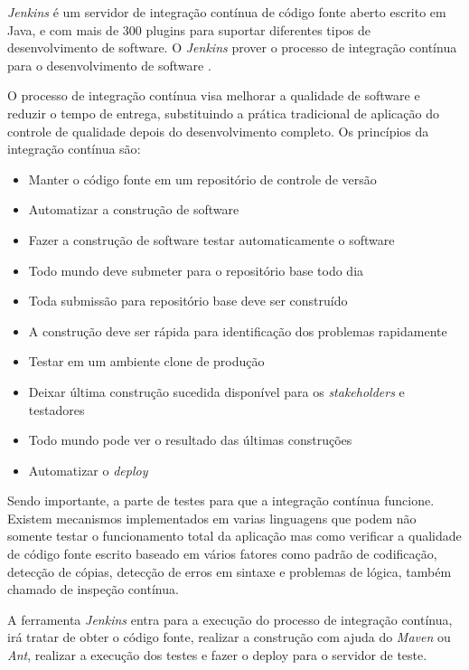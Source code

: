 \documentclass{abnt}
\begin{document}
				\emph{Jenkins} é um servidor de integração contínua de código fonte aberto escrito em Java, e com mais de 300 plugins para
				suportar diferentes tipos de desenvolvimento de software. O \emph{Jenkins} prover o processo de integração contínua para o
				desenvolvimento de software \cite{JENKINS}.
				
				O processo de integração contínua visa melhorar a qualidade de software e reduzir o tempo de entrega, substituindo a
				prática tradicional de aplicação do controle de qualidade depois do desenvolvimento completo. Os princípios da
				integração contínua são\cite{CIWIKIPEDIA}:
				\begin{itemize}
				  \item Manter o código fonte em um repositório de controle de versão
				  \item Automatizar a construção de software
				  \item Fazer a construção de software testar automaticamente o software
				  \item Todo mundo deve submeter para o repositório base todo dia
				  \item Toda submissão para repositório base deve ser construído
				  \item A construção deve ser rápida para identificação dos problemas rapidamente
				  \item Testar em um ambiente clone de produção
				  \item Deixar última construção sucedida disponível para os \emph{stakeholders} e testadores
				  \item Todo mundo pode ver o resultado das últimas construções
				  \item Automatizar o \emph{deploy}
				\end{itemize}
				
				Sendo importante, a parte de testes para que a integração contínua funcione. Existem mecanismos implementados em
				varias linguagens que podem não somente testar o funcionamento total da aplicação mas como verificar a qualidade de
				código fonte escrito baseado em vários fatores como padrão de codificação, detecção de cópias, detecção de erros em
				sintaxe e problemas de lógica, também chamado de inspeção contínua.\cite{INSPECAO-CONTINUA}
				
				A ferramenta \emph{Jenkins} entra para a execução do processo de integração contínua, irá tratar de obter o código fonte,
				realizar a construção com ajuda do \emph{Maven}\cite{MAVENBUILDTOOL} ou \emph{Ant}\cite{ANTBUILDTOOL}, realizar a execução dos testes e fazer o deploy para o servidor de
				teste.\cite{JENKINS-BUILD}
\end{document}
